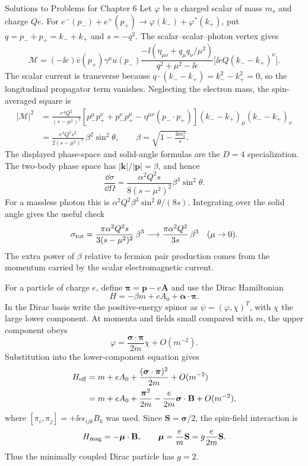 \begin{bankssolutions}{Solutions to Problems for Chapter 6}
Let $\varphi$ be a charged scalar of mass $m_s$ and charge $Qe$.  For
\(e^-(p_-)+e^+(p_+)\to\varphi(k_-)+\varphi^*(k_+)\), put
$q=p_-+p_+=k_-+k_+$ and $s=-q^2$.  The scalar--scalar--photon vertex gives
\begin{equation*}
 \mathcal M=(-\ii e)\bar v(p_+)\gamma^\mu u(p_-)
 \frac{-\ii(\eta_{\mu\nu}+q_\mu q_\nu/\mu^2)}
 {q^2+\mu^2-\ii\epsilon}
 \bigl[\ii eQ(k_--k_+)^\nu\bigr].
\end{equation*}
The scalar current is transverse because
$q\cdot(k_--k_+)=k_-^2-k_+^2=0$, so the longitudinal propagator term
vanishes.  Neglecting the electron mass, the spin-averaged square is
\begin{align*}
 \overline{|\mathcal M|^2}
 &=\frac{e^4Q^2}{(s-\mu^2)^2}
 \left[p_-^\mu p_+^\nu+p_-^\nu p_+^\mu
 -\eta^{\mu\nu}(p_-\cdot p_+)\right]
 (k_--k_+)_\mu(k_--k_+)_\nu\\
 &=\frac{e^4Q^2s^2}{2(s-\mu^2)^2}\,\beta^2\sin^2\theta,
 \qquad
 \beta=\sqrt{1-\frac{4m_s^2}{s}}.
\end{align*}
The displayed phase-space and solid-angle formulas are the \(D=4\)
specialization.  The two-body phase space has $|\mathbf k|/|\mathbf p|=\beta$, and hence
\begin{equation*}
 \frac{\dd\sigma}{\dd\Omega}
 =\frac{\alpha^2Q^2s}{8(s-\mu^2)^2}
 \beta^3\sin^2\theta.
\end{equation*}
For a massless photon this is
$\alpha^2Q^2\beta^3\sin^2\theta/(8s)$.  Integrating over the solid angle
gives the useful check
\[
 \sigma_{\rm tot}=\frac{\pi\alpha^2Q^2s}{3(s-\mu^2)^2}\,\beta^3
 \longrightarrow \frac{\pi\alpha^2Q^2}{3s}\,\beta^3
 \quad(\mu\to0).
\]
The extra power of $\beta$ relative to fermion pair production comes from
the momentum carried by the scalar electromagnetic current.

For a particle of charge $e$, define
$\boldsymbol\pi=\mathbf p-e\mathbf A$ and use the Dirac Hamiltonian
\[
 H=-\beta m+eA_0+\boldsymbol\alpha\cdot\boldsymbol\pi.
\]
In the Dirac basis write the positive-energy spinor as
$\psi=(\varphi,\chi)^T$, with \(\chi\) the large lower component.  At
momenta and fields small compared with $m$, the upper component obeys
\[
 \varphi=\frac{\boldsymbol\sigma\cdot\boldsymbol\pi}{2m}\chi
 +O(m^{-2}).
\]
Substitution into the lower-component equation gives
\begin{align*}
 H_{\rm eff}
 &=m+eA_0+\frac{(\boldsymbol\sigma\cdot\boldsymbol\pi)^2}{2m}
 +O(m^{-2})\\
 &=m+eA_0+\frac{\boldsymbol\pi^2}{2m}
 -\frac{e}{2m}\boldsymbol\sigma\cdot\mathbf B+O(m^{-2}),
\end{align*}
where $[\pi_i,\pi_j]=+\ii e\epsilon_{ijk}B_k$ was used.  Since
$\mathbf S=\boldsymbol\sigma/2$, the spin-field interaction is
\[
 H_{\rm mag}=-\boldsymbol\mu\cdot\mathbf B,
 \qquad
 \boldsymbol\mu=\frac{e}{m}\mathbf S
 =g\frac{e}{2m}\mathbf S.
\]
Thus the minimally coupled Dirac particle has $g=2$.


\end{bankssolutions}
